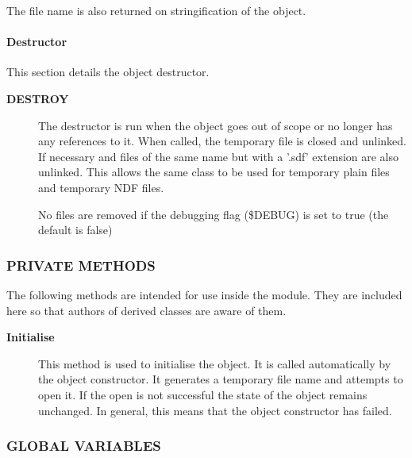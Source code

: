 \begin{description}
\begin{description}
\begin{description}
The file name is also returned on stringification of the object.

\end{description}
\paragraph*{Destructor\label{ORAC::TempFile_Destructor}}


This section details the object destructor.

\begin{description}

\item[{\textbf{DESTROY}}] \mbox{}

The destructor is run when the object goes out of scope
or no longer has any references to it. When called, the
temporary file is closed and unlinked. If necessary
and files of the same name but with a '.sdf' extension
are also unlinked. This allows the same class to be used
for temporary plain files and temporary NDF files.



No files are removed if the debugging flag (\$DEBUG) is set to
true (the default is false)

\end{description}
\subsubsection*{PRIVATE METHODS\label{ORAC::TempFile_PRIVATE_METHODS}}


The following methods are intended for use inside the module.
They are included here so that authors of derived classes are
aware of them.

\begin{description}

\item[{\textbf{Initialise}}] \mbox{}

This method is used to initialise the object. It is called
automatically by the object constructor. It generates
a temporary file name and attempts to open it. If the
open is not successful the state of the object remains
unchanged. In general, this means that the object
constructor has failed.

\end{description}
\subsubsection*{GLOBAL VARIABLES\label{ORAC::TempFile_GLOBAL_VARIABLES}}



\end{description}
\end{description}

